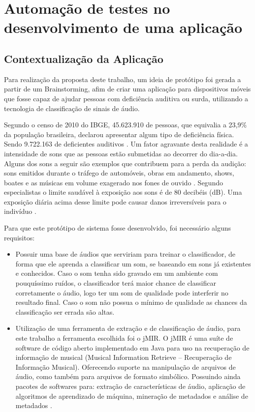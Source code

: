 \chapter{Automação de testes no desenvolvimento de uma aplicação}

\section{Contextualização da Aplicação}
Para realização da proposta deste trabalho, um ideia de protótipo foi gerada a partir de um Brainstorming, afim de criar uma aplicação para dispositivos móveis que fosse capaz de ajudar pessoas com deficiência auditiva ou surda, utilizando a tecnologia de classificação de sinais de áudio.

Segundo  o censo de 2010 do IBGE, 45.623.910 de pessoas, que equivalia a 23,9\% da população brasileira, declarou apresentar algum tipo de deficiência física. Sendo 9.722.163 de deficientes auditivos \cite{censo2010}. Um fator agravante desta realidade é a intensidade de sons que as pessoas estão submetidas ao decorrer do dia-a-dia. Alguns dos sons a seguir são exemplos que contribuem para a perda da audição: sons emitidos durante o tráfego de automóveis, obras em andamento, shows, boates e as músicas em volume exagerado nos fones de ouvido \cite{jornalDiaDia}. Segundo especialistas o limite saudável à exposição aos sons é de 80 decibéis (dB). Uma exposição diária acima desse limite pode causar danos irreversíveis para o indivíduo \cite{ruido}.

Para que este protótipo de sistema fosse desenvolvido, foi necessário alguns requisitos: 
\begin{itemize}
	\item Possuir uma base de áudios que serviriam para treinar o classificador, de forma que ele aprenda a classificar um som, se baseando em sons já existentes e conhecidos. Caso o som tenha sido gravado em um ambiente com pouquíssimo ruídos, o classificador terá maior chance de classificar corretamente o áudio, logo ter um som de qualidade pode interferir no resultado final. Caso o som não possua o mínimo de qualidade as chances da classificação ser errada são altas. 

	\item Utilização de uma ferramenta de extração e de classificação de áudio, para este trabalho a ferramenta escolhida foi o jMIR. O jMIR é uma suíte de software de código aberto implementado em Java para uso na recuperação de informação de musical (Musical Information Retrieve – Recuperação de Informação Musical). Oferecendo suporte  na manipulação de arquivos de áudio, como também para arquivos de formato simbólico. Possuindo ainda pacotes de softwares para: extração de características de áudio, aplicação de algoritmos de aprendizado de máquina, mineração de metadados e análise de metadados \cite{jmir}. 
\end{itemize}

